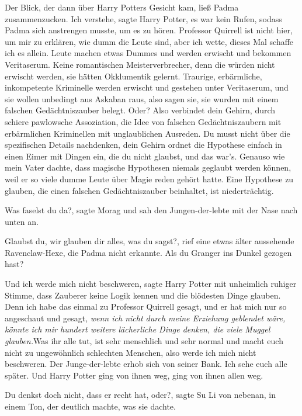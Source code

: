Der Blick, der dann über Harry Potters Gesicht kam, ließ Padma zusammenzucken.
\glqq Ich verstehe\grqq{}, sagte Harry Potter, es war kein Rufen, sodass Padma
sich anstrengen musste, um es zu hören. \glqq Professor Quirrell ist nicht hier,
um mir zu erklären, wie dumm die Leute sind, aber ich wette, dieses Mal schaffe
ich es allein. Leute machen etwas Dummes und werden erwischt und bekommen
Veritaserum. Keine romantischen Meisterverbrecher, denn die würden nicht
erwischt werden, sie hätten Okklumentik gelernt. Traurige, erbärmliche,
inkompetente Kriminelle werden erwischt und gestehen unter Veritaserum, und sie
wollen unbedingt aus Askaban raus, also sagen sie, sie wurden mit einem falschen
Gedächtniszauber belegt. Oder? Also verbindet dein Gehirn, durch schiere
pawlowsche Assoziation, die Idee von falschen Gedächtniszaubern mit erbärmlichen
Kriminellen mit unglaublichen Ausreden. Du musst nicht über die spezifischen
Details nachdenken, dein Gehirn ordnet die Hypothese einfach in einen Eimer mit
Dingen ein, die du nicht glaubst, und das war's. Genauso wie mein Vater dachte,
dass magische Hypothesen niemals geglaubt werden können, weil er so viele dumme
Leute über Magie reden gehört hatte. Eine Hypothese zu glauben, die einen
falschen Gedächtniszauber beinhaltet, ist niederträchtig.\grqq{}

\glqq Was faselst du da?\grqq{}, sagte Morag und sah den Jungen-der-lebte mit
der Nase nach unten an.

\glqq Glaubst du, wir glauben dir alles, was du sagst?\grqq{}, rief eine etwas
älter aussehende Ravenclaw-Hexe, die Padma nicht erkannte. \glqq Als du Granger
ins Dunkel gezogen hast?\grqq{}

\glqq Und ich werde mich nicht beschweren\grqq{}, sagte Harry Potter mit
unheimlich ruhiger Stimme, \glqq dass Zauberer keine Logik kennen und die
blödesten Dinge glauben. Denn ich habe das einmal zu Professor Quirrell gesagt,
und er hat mich nur so angeschaut und gesagt, \emph{wenn ich nicht durch meine
Erziehung geblendet wäre, könnte ich mir hundert weitere lächerliche Dinge
denken, die viele Muggel glauben.}Was ihr alle tut, ist sehr menschlich und sehr
normal und macht euch nicht zu ungewöhnlich schlechten Menschen, also werde ich
mich nicht beschweren.\grqq{} Der Junge-der-lebte erhob sich von seiner Bank.
\glqq Ich sehe euch alle später.\grqq{} Und Harry Potter ging von ihnen weg,
ging von ihnen allen weg.

\glqq Du denkst doch nicht, dass er recht hat, oder?\grqq{}, sagte Su Li von
nebenan, in einem Ton, der deutlich machte, was sie dachte.

